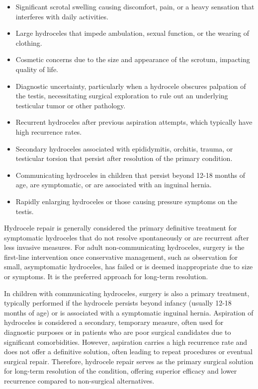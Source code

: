 \begin{itemize}
  \item Significant scrotal swelling causing discomfort, pain, or a heavy sensation that interferes with daily activities.
  \item Large hydroceles that impede ambulation, sexual function, or the wearing of clothing.
  \item Cosmetic concerns due to the size and appearance of the scrotum, impacting quality of life.
  \item Diagnostic uncertainty, particularly when a hydrocele obscures palpation of the testis, necessitating surgical exploration to rule out an underlying testicular tumor or other pathology.
  \item Recurrent hydroceles after previous aspiration attempts, which typically have high recurrence rates.
  \item Secondary hydroceles associated with epididymitis, orchitis, trauma, or testicular torsion that persist after resolution of the primary condition.
  \item Communicating hydroceles in children that persist beyond 12-18 months of age, are symptomatic, or are associated with an inguinal hernia.
  \item Rapidly enlarging hydroceles or those causing pressure symptoms on the testis.
\end{itemize}

Hydrocele repair is generally considered the primary definitive treatment for symptomatic hydroceles that do not resolve spontaneously or are recurrent after less invasive measures. For adult non-communicating hydroceles, surgery is the first-line intervention once conservative management, such as observation for small, asymptomatic hydroceles, has failed or is deemed inappropriate due to size or symptoms. It is the preferred approach for long-term resolution.

In children with communicating hydroceles, surgery is also a primary treatment, typically performed if the hydrocele persists beyond infancy (usually 12-18 months of age) or is associated with a symptomatic inguinal hernia. Aspiration of hydroceles is considered a secondary, temporary measure, often used for diagnostic purposes or in patients who are poor surgical candidates due to significant comorbidities. However, aspiration carries a high recurrence rate and does not offer a definitive solution, often leading to repeat procedures or eventual surgical repair. Therefore, hydrocele repair serves as the primary surgical solution for long-term resolution of the condition, offering superior efficacy and lower recurrence compared to non-surgical alternatives.

